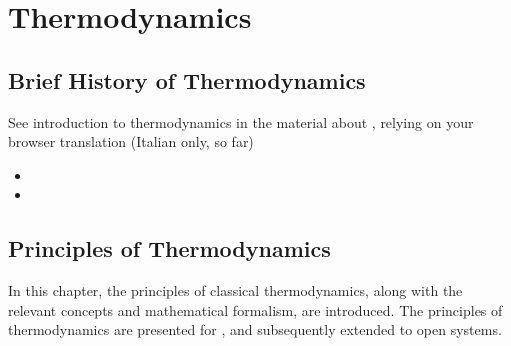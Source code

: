 \documentclass[letterpaper,10pt,english]{jupyterBook}
\begin{document}
\sphinxstepscope


\part{Thermodynamics}

\sphinxstepscope




\chapter{Brief History of Thermodynamics}
\label{\detokenize{ch/history:brief-history-of-thermodynamics}}\label{\detokenize{ch/history:classical-thermodynamics-history}}\label{\detokenize{ch/history::doc}}
\sphinxAtStartPar
See introduction to thermodynamics in the material about , relying on your browser translation (Italian only, so far)
\begin{itemize}
\item {} 
\sphinxAtStartPar
{}

\item {} 
\sphinxAtStartPar
{}

\end{itemize}



\sphinxstepscope


\chapter{Principles of Thermodynamics}
\label{\detokenize{ch/principles:principles-of-thermodynamics}}\label{\detokenize{ch/principles:physics-hs-thermodynamics-principles}}\label{\detokenize{ch/principles::doc}}
\sphinxAtStartPar
In this chapter, the principles of classical thermodynamics, along with the relevant concepts and mathematical formalism, are introduced.
The principles of thermodynamics are presented for , and subsequently extended to open systems.
\end{document}
